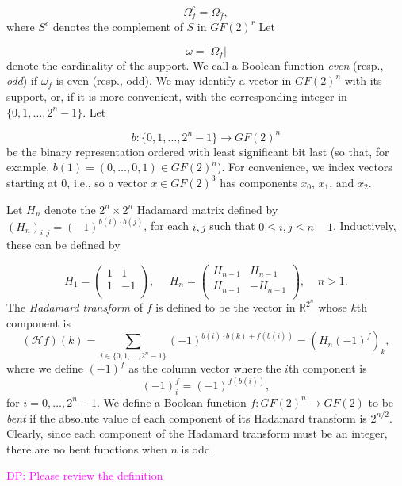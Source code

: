 \documentclass[12pt]{article}
\def\magenta#1{\textcolor{magenta}{#1}}
\newcommand{\djp}[1]{\magenta{DP: #1}}
\newcommand{\djp}[1]{}
\def\rrr{\mathbb{R}}
\def\zzz{\mathbb{Z}}
\newcommand{\Hcal}{{\mathcal{H}}}
\newcommand{\onef}{(-1)^f}
\begin{document}
\[
\Omega_f^c=\Omega_{\overline{f}},
\]
where $S^c$ denotes the complement of $S$ in $GF(2)^r$
Let

\[
\omega=|\Omega_f|
\]
denote the cardinality of the support.
We call a Boolean function {\it even} (resp., {\it odd}) if
$\omega_f$ is even (resp., odd).
We may identify a vector in $GF(2)^n$ with its support, or,
if it is more convenient, with the corresponding integer in
$\{0,1, \dots, 2^n-1\}.$ Let

\[
b:\{0,1, \dots, 2^n-1\} \to GF(2)^n
\]
be the binary representation ordered with least significant
bit last (so that, for example, $b(1)=(0,\dots, 0, 1)\in GF(2)^n$).
For convenience, we index vectors starting at 0, i.e., so a vector $x
\in GF(2)^3$ has components $x_0$, $x_1$, and $x_2$.



Let $H_n$ denote the $2^n\times 2^n$ Hadamard matrix
defined by $(H_n)_{i,j} = (-1)^{b(i)\cdot b(j)}$, for each $i,j$
such that $0\leq i,j\leq n-1$. Inductively, these can be defined by

\[
H_1 =
\left(
\begin{array}{cc}
1 & 1\\
1 & -1 \\
\end{array}
\right),
\ \ \ \ \ \
H_n =
\left(
\begin{array}{cc}
H_{n-1} & H_{n-1}\\
H_{n-1} & -H_{n-1} \\
\end{array}
\right),
\ \ \ \ \
n>1.
\]
The {\it Hadamard transform} of $f$ is defined to be
the vector in $\rrr^{2^n}$ whose $k$th component is
\[
(\Hcal f)(k) = \sum_{i \in \{0,1,\ldots,2^n-1\}}(-1)^{b(i) \cdot b(k) + f(b(i))} =
(H_n \onef)_k,
\]
where we define $\onef$ as the column vector where the $i$th
component is
\[
\onef_i = (-1)^{f(b(i))},
\]
for $i = 0,\ldots,2^n-1$.
We define a Boolean function
$f:GF(2)^n\to GF(2)$ to be {\it bent} if the absolute value of each
component of its
Hadamard transform is $2^{n/2}$. Clearly, since each component of the Hadamard
transform must be an integer, there are no bent functions
when $n$ is odd.

\djp{Please review the definition}
\end{document}
